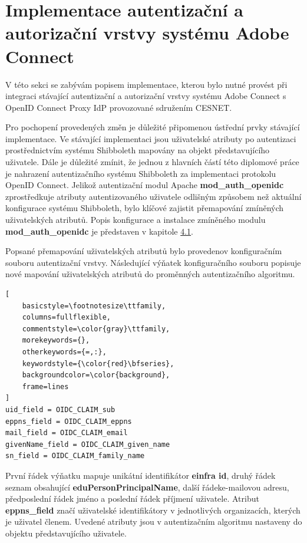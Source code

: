 \documentclass[
  printed, %
  twoside, %
  table,   %
  nolof,     %
  nolot,     %
]{fithesis3}
\begin{document}
\section{Implementace autentizační a autorizační vrstvy systému Adobe Connect}
\label{ACImpl}
V této sekci se zabývám popisem implementace, kterou bylo nutné provést při integraci stávající autentizační a autorizační vrstvy systému Adobe Connect s OpenID Connect Proxy IdP provozované sdružením CESNET. 
\par 
Pro pochopení provedených změn je důležité připomenou ústřední prvky stávající implementace. Ve stávající implementaci jsou uživatelské atributy po autentizaci prostřednictvím systému Shibboleth mapovány na objekt představujícího uživatele. Dále je důležité zmínit, že jednou z hlavních částí této diplomové práce je nahrazení autentizačního systému Shibboleth za implementaci protokolu OpenID Connect. Jelikož autentizační modul Apache \textbf{mod\_auth\_openidc} zprostředkuje atributy autentizovaného uživatele odlišným způsobem než aktuální konfigurace systému Shibboleth, bylo klíčové zajistit přemapování zmíněných uživatelských atributů. Popis konfigurace a instalace zmíněného modulu \textbf{mod\_auth\_openidc} je představen v kapitole \hyperref[apacheInstall]{4.1}.  
\par

Popsané přemapování uživatelských atributů bylo provedeno\break v konfiguračním souboru  autentizační vrstvy. Následující výňatek konfiguračního souboru popisuje nové mapování uživatelských atributů do proměnných autentizačního algoritmu. 

\begin{lstlisting}[
    basicstyle=\footnotesize\ttfamily,
    columns=fullflexible,
    commentstyle=\color{gray}\ttfamily,
    morekeywords={},
    otherkeywords={=,:},
    keywordstyle={\color{red}\bfseries},
    backgroundcolor=\color{background},
    frame=lines
]
uid_field = OIDC_CLAIM_sub
eppns_field = OIDC_CLAIM_eppns
mail_field = OIDC_CLAIM_email
givenName_field = OIDC_CLAIM_given_name
sn_field = OIDC_CLAIM_family_name
\end{lstlisting}
První řádek výňatku mapuje unikátní identifikátor \textbf{einfra id}, druhý řádek seznam obsahující \textbf{eduPersonPrincipalName}, další řádek\break e-mailovou adresu, předposlední řádek jméno a poslední řádek příjmení uživatele. Atribut \textbf{eppns\_field} značí uživatelské identifikátory v jednotlivých organizacích, kterých je uživatel členem. Uvedené atributy jsou v autentizačním algoritmu nastaveny do objektu představujícího uživatele. 
\par 
\end{document}
